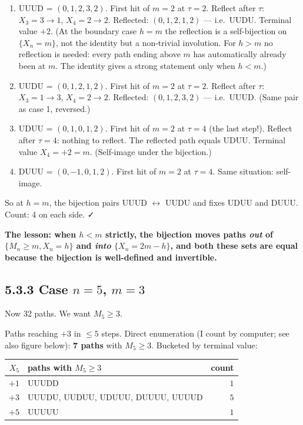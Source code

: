 \documentclass[
  10pt,
  twoside]{book}
\newcounter{none} %
\begin{document}
\begin{enumerate}
\def\labelenumi{\arabic{enumi}.}
\item
  UUUD = \((0, 1, 2, 3, 2)\). First hit of \(m = 2\) at \(\tau = 2\).
  Reflect after \(\tau\): \(X_3 = 3 \to 1\), \(X_4 = 2 \to 2\).
  Reflected: \((0, 1, 2, 1, 2)\) --- i.e.~UUDU. Terminal value \(+2\).
  (At the boundary case \(h = m\) the reflection is a self-bijection on
  \(\{X_n = m\}\), not the identity but a non-trivial involution. For
  \(h > m\) no reflection is needed: every path ending above \(m\) has
  automatically already been at \(m\). The identity gives a strong
  statement only when \(h < m\).)
\item
  UUDU = \((0, 1, 2, 1, 2)\). First hit of \(m = 2\) at \(\tau = 2\).
  Reflect after \(\tau\): \(X_3 = 1 \to 3\), \(X_4 = 2 \to 2\).
  Reflected: \((0, 1, 2, 3, 2)\) --- i.e.~UUUD. (Same pair as case 1,
  reversed.)
\item
  UDUU = \((0, 1, 0, 1, 2)\). First hit of \(m = 2\) at \(\tau = 4\)
  (the last step!). Reflect after \(\tau = 4\): nothing to reflect. The
  reflected path equals UDUU. Terminal value \(X_4 = +2 = m\).
  (Self-image under the bijection.)
\item
  DUUU = \((0, -1, 0, 1, 2)\). First hit of \(m = 2\) at \(\tau = 4\).
  Same situation: self-image.
\end{enumerate}

So at \(h = m\), the bijection pairs UUUD \(\leftrightarrow\) UUDU and
fixes UDUU and DUUU. Count: 4 on each side. ✓

\textbf{The lesson: when \(h < m\) strictly, the bijection moves paths
\emph{out} of \(\{M_n \ge m, X_n = h\}\) and \emph{into}
\(\{X_n = 2m - h\}\), and both these sets are equal because the
bijection is well-defined and invertible.}

\subsection{\texorpdfstring{5.3.3 Case \(n = 5\),
\(m = 3\)}{5.3.3 Case n = 5, m = 3}}\label{case-n-5-m-3}

Now 32 paths. We want \(M_5 \ge 3\).

Paths reaching \(+3\) in \(\le 5\) steps. Direct enumeration (I count by
computer; see also figure below): \textbf{7 paths} with \(M_5 \ge 3\).
Bucketed by terminal value:

{\def\LTcaptype{none} %
\begin{table}[H]
\centering
\begin{tabular}{|r|l|r|}
\toprule
\(X_5\) & paths with \(M_5 \ge 3\) & count \\
\midrule



\(+1\) & UUUDD & \(1\) \\
\(+3\) & UUUDU, UUDUU, UDUUU, DUUUU, UUUUD & \(5\) \\
\(+5\) & UUUUU & \(1\) \\
\bottomrule
\end{tabular}
\end{table}
}
\end{document}
